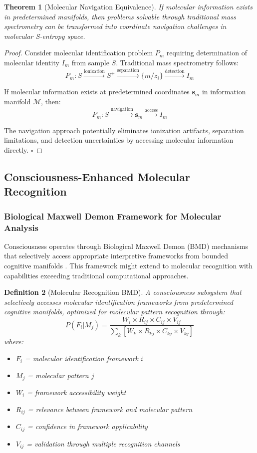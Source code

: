 \documentclass[11pt,a4paper]{article}
\newtheorem{theorem}{Theorem}[section]
\newtheorem{definition}[theorem]{Definition}
\theoremstyle{remark}
\begin{document}
\begin{theorem}[Molecular Navigation Equivalence]
If molecular information exists in predetermined manifolds, then problems solvable through traditional mass spectrometry can be transformed into coordinate navigation challenges in molecular S-entropy space.
\end{theorem}

\begin{proof}
Consider molecular identification problem $P_m$ requiring determination of molecular identity $I_m$ from sample $S$. Traditional mass spectrometry follows:
$$P_m: S \xrightarrow{\text{ionization}} S^+ \xrightarrow{\text{separation}} \{m/z_i\} \xrightarrow{\text{detection}} I_m$$

If molecular information exists at predetermined coordinates $\mathbf{s}_m$ in information manifold $\mathcal{M}$, then:
$$P_m: S \xrightarrow{\text{navigation}} \mathbf{s}_m \xrightarrow{\text{access}} I_m$$

The navigation approach potentially eliminates ionization artifacts, separation limitations, and detection uncertainties by accessing molecular information directly. $\square$
\end{proof}

\subsection{Consciousness-Enhanced Molecular Recognition}

\subsubsection{Biological Maxwell Demon Framework for Molecular Analysis}

Consciousness operates through Biological Maxwell Demon (BMD) mechanisms that selectively access appropriate interpretive frameworks from bounded cognitive manifolds \cite{sachikonye2024consciousness}. This framework might extend to molecular recognition with capabilities exceeding traditional computational approaches.

\begin{definition}[Molecular Recognition BMD]
A consciousness subsystem that selectively accesses molecular identification frameworks from predetermined cognitive manifolds, optimized for molecular pattern recognition through:
$$P(F_i|M_j) = \frac{W_i \times R_{ij} \times C_{ij} \times V_{ij}}{\sum_k[W_k \times R_{kj} \times C_{kj} \times V_{kj}]}$$
where:
\begin{itemize}
\item $F_i$ = molecular identification framework $i$
\item $M_j$ = molecular pattern $j$
\item $W_i$ = framework accessibility weight
\item $R_{ij}$ = relevance between framework and molecular pattern
\item $C_{ij}$ = confidence in framework applicability
\item $V_{ij}$ = validation through multiple recognition channels
\end{itemize}
\end{definition}
\end{document}
